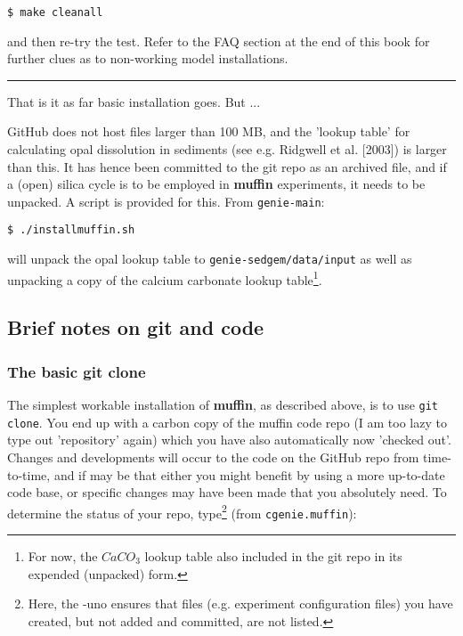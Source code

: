 \documentclass[11pt,fleqn]{book} %
\begin{document}
\vspace{-2mm}
\begin{verbatim}
$ make cleanall
\end{verbatim}
\vspace{-2mm}

\noindent and then re-try the test. Refer to the FAQ section at the end of this book for further clues as to non-working model installations.

\vspace{1mm}
\noindent\rule{4cm}{0.5pt}
\vspace{2mm}

\noindent That is it as far basic installation goes. But ...

\noindent GitHub does not host files larger than 100 MB, and the 'lookup table' for calculating opal dissolution in sediments (see e.g. Ridgwell et al. [2003]) is larger than this. It has hence been committed to the git repo as an archived file, and if a (open) silica cycle is to be employed in \textbf{muffin} experiments, it needs to be unpacked. A script is provided for this. From \texttt{genie-main}:

\vspace{-2mm}
\begin{verbatim}
$ ./installmuffin.sh
\end{verbatim}
\vspace{-2mm}

\noindent will unpack the opal lookup table to \texttt{genie-sedgem/data/input} as well as unpacking a copy of the calcium carbonate lookup table\footnote{For now, the \(CaCO_{3}\) lookup table also included in the git repo in its expended (unpacked) form.}.


\subsection{Brief notes on git and code}

\subsubsection*{The basic git clone}

The simplest workable installation of \textbf{muffin}, as described above, is to use \texttt{git clone}. You end up with a carbon copy of the muffin code repo (I am too lazy to type out 'repository' again) which you have also automatically now 'checked out'. Changes and developments will occur to the code on the GitHub repo from time-to-time, and if may be that either you might benefit by using a more up-to-date code base, or specific changes may have been made that you absolutely need. To determine the status of your repo, type\footnote{Here, the -uno ensures that files (e.g. experiment configuration files) you have created, but not added and committed, are not listed.} (from \texttt{cgenie.muffin}):
\end{document}

